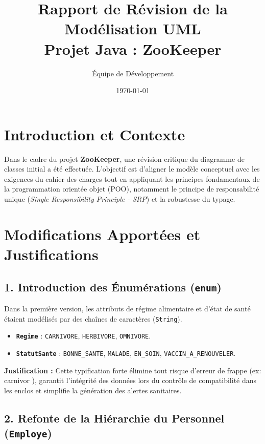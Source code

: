 \documentclass[12pt,a4paper]{article}
\title{
   \textbf{Rapport de Révision de la Modélisation UML}\\
   \large Projet Java : ZooKeeper
}
\author{Équipe de Développement}
\date{\today}
\begin{document}
\maketitle

\section{Introduction et Contexte}

Dans le cadre du projet \textbf{ZooKeeper}, une révision critique du diagramme
de classes initial a été effectuée. L'objectif est d'aligner le modèle
conceptuel avec les exigences du cahier des charges tout en appliquant les
principes fondamentaux de la programmation orientée objet (POO), notamment le
principe de responsabilité unique (\textit{Single Responsibility Principle -
SRP}) et la robustesse du typage.

\section{Modifications Apportées et Justifications}

\subsection{1. Introduction des Énumérations (\texttt{enum})}

Dans la première version, les attributs de régime alimentaire et d'état de santé
étaient modélisés par des chaînes de caractères (\texttt{String}).
\begin{itemize}
   \item \textbf{\texttt{Regime}} : \texttt{CARNIVORE}, \texttt{HERBIVORE},
         \texttt{OMNIVORE}.
   \item \textbf{\texttt{StatutSante}} : \texttt{BONNE\_SANTE}, \texttt{MALADE},
         \texttt{EN\_SOIN}, \texttt{VACCIN\_A\_RENOUVELER}.
\end{itemize}
\textbf{Justification :} Cette typification forte élimine tout risque d'erreur
de frappe (ex: \og carnivor \fg{}), garantit l'intégrité des données lors du
contrôle de compatibilité dans les enclos et simplifie la génération des alertes
sanitaires.

\subsection{2. Refonte de la Hiérarchie du Personnel (\texttt{Employe})}
\end{document}
